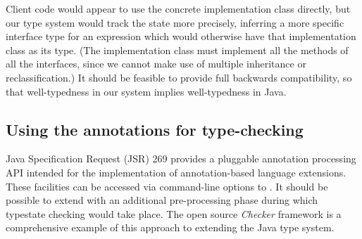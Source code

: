 \noindent Client code would appear to use the concrete implementation
class directly, but our type system would track the state more
precisely, inferring a more specific interface type for an expression
which would otherwise have that implementation class as its type. (The
implementation class must implement all the methods of all the
interfaces, since we cannot make use of multiple inheritance or
reclassification.) It should be feasible to provide full backwards
compatibility, so that well-typedness in our system implies
well-typedness in Java.

\subsection{Using the annotations for type-checking}

Java Specification Request (JSR) 269 \cite{jsr269} provides a
pluggable annotation processing API intended for the implementation of
annotation-based language extensions. These facilities can be accessed
via command-line options to . It should be possible to
extend  with an additional pre-processing phase during
which typestate checking would take place. The open source
\emph{Checker} framework \cite{papi08,dietl11} is a comprehensive
example of this approach to extending the Java type system.
